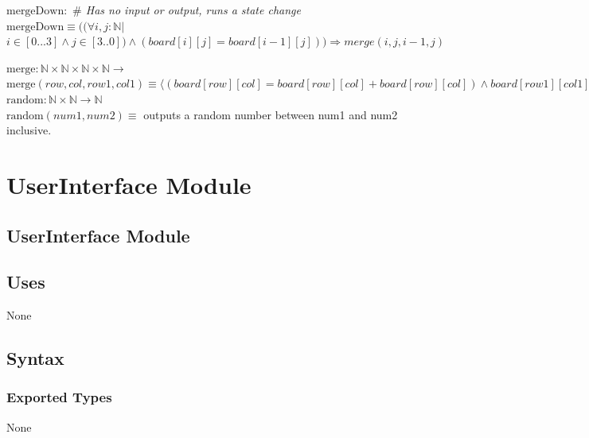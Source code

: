 \documentclass[12pt]{article}
\begin{document}
\noindent $\mbox{mergeDown}:$ \textit{$\#$ Has no input or output, runs a state change}\\
\noindent $\mbox{mergeDown} \equiv ((\forall i, j :  \mathbb{N} |$ $i \in [0...3] \land j \in[3..0]) \land (board[i][j] = board[i-1][j])) \Rightarrow merge(i, j, i-1, j)$ \newline

\noindent $\mbox{merge}:\mathbb{N} \times \mathbb{N} \times \mathbb{N} \times \mathbb{N} \rightarrow $\\
\noindent $\mbox{merge}(row, col, row1, col1) \equiv \langle (board[row][col] = board[row][col] + board[row][col]) \land board[row1][col1] = 0 \rangle$\\

\noindent $\mbox{random}:\mathbb{N} \times \mathbb{N} \rightarrow \mathbb{N}$ \\
\noindent $\mbox{random}(num1, num2) \equiv$ outputs a random number between num1 and num2 inclusive. 

\newpage


\section* {UserInterface Module}

\subsection* {UserInterface Module}

\subsection* {Uses}

None

\subsection* {Syntax}

\subsubsection* {Exported Types}

None
\end{document}
